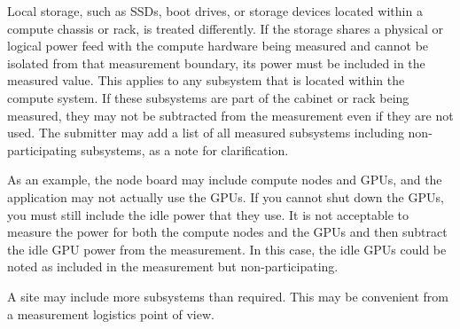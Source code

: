 Local storage, such as SSDs, boot drives, or storage devices located within a compute chassis or rack, is treated differently.
If the storage shares a physical or logical power feed with the compute hardware being measured and cannot be isolated from that measurement boundary, its power must be included in the measured value.
This applies to any subsystem that is located within the compute system.
If these subsystems are part of the cabinet or rack being measured, they may not be subtracted from the measurement even if they are not used.
The submitter may add a list of all measured subsystems including non-participating subsystems, as a note for clarification.



As an example, the node board may include compute nodes and GPUs, and the application may not actually use the GPUs.
If you cannot shut down the GPUs, you must still include the idle power that they use.
It is not acceptable to measure the power for both the compute nodes and the GPUs and then subtract the idle GPU power from the measurement.
In this case, the idle GPUs could be noted as included in the measurement but non-participating.

A site may include more subsystems than required. This may be convenient from a measurement logistics point of view.



